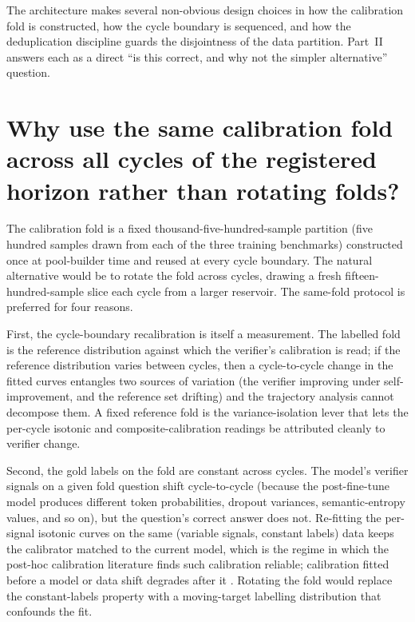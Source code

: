 The architecture makes several non-obvious design choices in how the calibration fold is constructed, how the cycle boundary is sequenced, and how the deduplication discipline guards the disjointness of the data partition. Part~II answers each as a direct ``is this correct, and why not the simpler alternative'' question.


\section[Same calibration fold across cycles]{Why use the same calibration fold across all cycles of the registered horizon rather than rotating folds?}
\label{app:qa-same-fold}

The calibration fold is a fixed thousand-five-hundred-sample partition (five hundred samples drawn from each of the three training benchmarks) constructed once at pool-builder time and reused at every cycle boundary. The natural alternative would be to rotate the fold across cycles, drawing a fresh fifteen-hundred-sample slice each cycle from a larger reservoir. The same-fold protocol is preferred for four reasons.

First, the cycle-boundary recalibration is itself a measurement. The labelled fold is the reference distribution against which the verifier's calibration is read; if the reference distribution varies between cycles, then a cycle-to-cycle change in the fitted curves entangles two sources of variation (the verifier improving under self-improvement, and the reference set drifting) and the trajectory analysis cannot decompose them. A fixed reference fold is the variance-isolation lever that lets the per-cycle isotonic and composite-calibration readings be attributed cleanly to verifier change.

Second, the gold labels on the fold are constant across cycles. The model's verifier signals on a given fold question shift cycle-to-cycle (because the post-fine-tune model produces different token probabilities, dropout variances, semantic-entropy values, and so on), but the question's correct answer does not. Re-fitting the per-signal isotonic curves on the same (variable signals, constant labels) data keeps the calibrator matched to the current model, which is the regime in which the post-hoc calibration literature finds such calibration reliable; calibration fitted before a model or data shift degrades after it \cite{ovadia2019trust}. Rotating the fold would replace the constant-labels property with a moving-target labelling distribution that confounds the fit.


